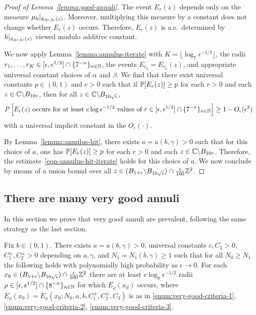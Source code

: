 \documentclass[12pt]{amsart}
\numberwithin{equation}{section}
\begin{document}
	
	\begin{proof}[Proof of Lemma~\ref{lemma:good-annuli}]
		The event $E_r(z)$ depends only on the measure $\mu_h|_{\A_{3 r,5r}(z)}$. Moreover, multiplying this measure by a constant does not change whether $E_r(z)$ occurs. 
		Therefore, $E_r(z)$ is a.s.\ determined by $h|_{\A_{3 r,5r}(z)}$ viewed modulo additive constant.
		
		We now apply Lemma~\ref{lemma:annulus-iterate} with $K = \lfloor \log_7  \epsilon^{-1/2} \rfloor$, the radii $r_1,\dots,r_K \in [ \epsilon, \epsilon^{1/2}] \cap \{7^{-n}\}_{n\in\N}$, the events $E_{r_k} = E_{r_k}(z)$, and appropriate universal constant choices of $\alpha$ and $\beta$. We find that there exist universal constants $p\in (0,1)$ and $c>0$ such that if $\P[E_r(z)] \geq p$
		for each $r > 0$ and each $z \in \C \backslash B_{10 r}$,  then for all $z \in \C \backslash B_{10 \sqrt{\epsilon}}$, 
		\begin{equation} \label{eqn-annulus-hit-iterate}
		P\left[ \text{$E_r(z)$ occurs for at least $c\log\epsilon^{-1/2}$ values of $r \in [ \epsilon, \epsilon^{1/2}] \cap \{7^{-n}\}_{n\in\N}$} \right] \geq 1 - O_\epsilon(\epsilon^3) 
		\end{equation} 
		with a universal implicit constant in the $O_\epsilon(\cdot)$. 
		
		By Lemma~\ref{lemma:annulus-hit}, there exists $a = a(b,\gamma) > 0$ such that for this choice of $a$, one has $\P[E_r(z)] \geq p$ for each $r > 0$ and each $z \in \C \backslash B_{10 r}$. Therefore, the estimate~\eqref{eqn-annulus-hit-iterate} holds for this choice of $a$. We now conclude by means of a union bound over all $z\in  (B_{1 + \epsilon} \backslash B_{10 \sqrt{\epsilon}}) \cap \frac{\epsilon}{100} \Z^2$. 
	\end{proof}
	
	
	\subsection{There are many very good annuli} \label{subsec:very-good-annuli-are-prevalent}
	In this section we prove that very good annuli are prevalent, following the same strategy as the last section. 
	
	\begin{lemma} \label{lemma:very-good-annuli}
		Fix $b \in (0,1)$. There exists $a = a(b,\gamma) > 0$, universal constants $c, C_3 > 0$, $C^{\pm}_1, C^{\pm}_2 > 0$ depending on $a, \gamma$, and $N_1 = N_1(b,\gamma) \geq 1$ such that for all $N_0  \geq N_1 $ the following holds with polynomially high probability as $\epsilon \to 0$. For each $x_0 \in (B_{1 + \epsilon} \backslash B_{10 \sqrt{\epsilon}}) \cap \frac{\epsilon}{100} \Z^2$ there are at least $c \log_8 \epsilon^{-1/2}$ radii $\rho \in [\epsilon, \epsilon^{1/2}] \cap
		\{8^{-n}\}_{n \in \N}$ for which $\overline E_\rho(x_0)$ occurs, where $\overline E_\rho(x_0) = \overline E_\rho(x_0; N_0, a, b,C^{\pm}_1, C^{\pm}_2, C_3)$ is as in \ref{enum:very-good-criteria-1}, 	\ref{enum:very-good-criteria-2}, 	\ref{enum:very-good-criteria-3}.
		
	\end{lemma}
	
\end{document}

